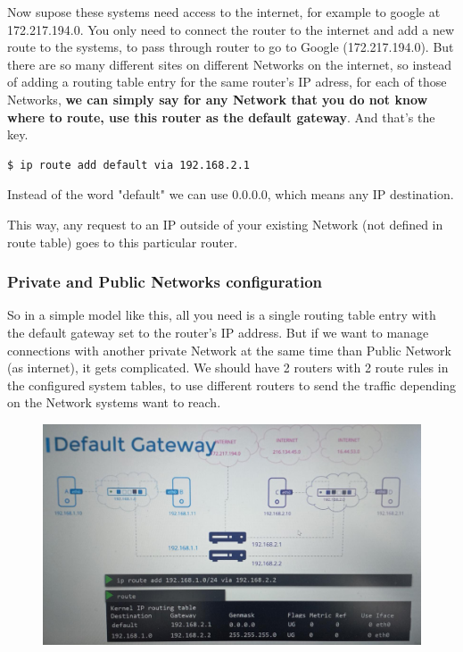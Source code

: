 \documentclass{article}
\newenvironment{blocktemplate}[1]{%
    \tcolorbox[beamer,%
    noparskip,breakable,
    colframe=Blue,%
    colbacklower=LimeGreen!75!LightGreen,%
    title=#1]}%
    {\endtcolorbox}
\newenvironment{codetemplate}[1][]{%
  \mybasecolorbox[#1]
  \itshape
}{%
  \endmybasecolorbox
}
\begin{document}
Now supose these systems need access to the internet, for example to google at 172.217.194.0. You only need to connect the router to the internet and add a new route to the systems, to pass through router to go to Google (172.217.194.0). But there are so many different sites on different Networks on the internet, so instead of adding a routing table entry for the same router's IP adress, for each of those Networks, \textbf{we can simply say for any Network that you do not know where to route, use this router as the default gateway}. And that's the key.

\begin{codetemplate}{}
\begin{verbatim}
$ ip route add default via 192.168.2.1
\end{verbatim}
\end{codetemplate}

\begin{blocktemplate}{NOTE}
Instead of the word "default" we can use 0.0.0.0, which means any IP destination.
\end{blocktemplate}

This way, any request to an IP outside of your existing Network (not defined in route table) goes to this particular router. 

\subsubsection{Private and Public Networks configuration}

So in a simple model like this, all you need is a single routing table entry with the default gateway set to the router's IP address. But if we want to manage connections with another private Network at the same time than Public Network (as internet), it gets complicated. We should have 2 routers with 2 route rules in the configured system tables, to use different routers to send the traffic depending on the Network systems want to reach.

\begin{figure}[H]
    \includegraphics[width=\textwidth]{pictures/ntw5.png}
\end{figure}
\end{document}
